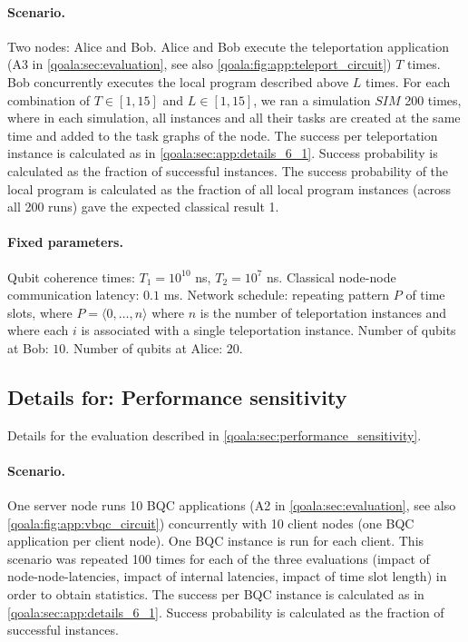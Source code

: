 \paragraph{Scenario.}
Two nodes: Alice and Bob.
Alice and Bob execute the teleportation application (A3 in \cref{qoala:sec:evaluation}, see also \cref{qoala:fig:app:teleport_circuit}) $T$ times.
Bob concurrently executes the local program described above $L$ times.
For each combination of $T \in [1, 15]$ and $L \in [1, 15]$, we ran a simulation $SIM$ 200 times, where in each simulation, all instances and all their tasks are created at the same time and added to the task graphs of the node.
The success per teleportation instance is calculated as in \cref{qoala:sec:app:details_6_1}.
Success probability is calculated as the fraction of successful instances.
The success probability of the local program is calculated as the fraction of all local program instances (across all 200 runs) gave the expected classical result 1.

\paragraph{Fixed parameters.}
Qubit coherence times: $T_1 = 10^{10}$ ns, $T_2 = 10^7$ ns.
Classical node-node communication latency: $0.1$ ms.
Network schedule: repeating pattern $P$ of time slots, where $P = \langle 0, \dots, n \rangle$ where $n$ is the number of teleportation instances and where each $i$ is associated with a single teleportation instance.
Number of qubits at Bob: $10$.
Number of qubits at Alice: $20$.


\subsection{Details for: Performance sensitivity}
Details for the evaluation described in \cref{qoala:sec:performance_sensitivity}.

\paragraph{Scenario.}
One server node runs 10 BQC applications (A2 in \cref{qoala:sec:evaluation}, see also \cref{qoala:fig:app:vbqc_circuit}) concurrently with 10 client nodes (one BQC application per client node).
One BQC instance is run for each client.
This scenario was repeated 100 times for each of the three evaluations (impact of node-node-latencies, impact of internal latencies, impact of time slot length) in order to obtain statistics.
The success per BQC instance is calculated as in \cref{qoala:sec:app:details_6_1}.
Success probability is calculated as the fraction of successful instances.

